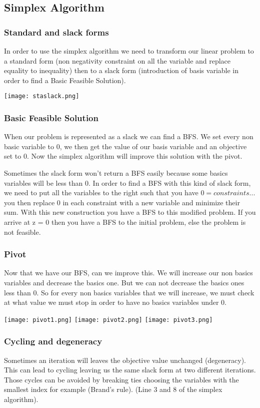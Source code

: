 \subsection{Simplex Algorithm}

\subsubsection{Standard and slack forms}
In order to use the simplex algorithm we need to transform our linear problem to a standard form (non negativity constraint on all the variable and replace equality to inequality) then to a slack form (introduction of basis variable in order to find a Basic Feasible Solution).

\centerline{\texttt{[image: staslack.png]}}

\subsubsection{Basic Feasible Solution}
When our problem is represented as a slack we can find a BFS. We set every non basic variable to 0, we then get the value of our basis variable and an objective set to 0. Now the simplex algorithm will improve this solution with the pivot.

Sometimes the slack form won't return a BFS easily because some basics variables will be less than 0. In order to find a BFS with this kind of slack form, we need to put all the variables to the right such that you have $0 = constraints ...$ you then replace 0 in each constraint with a new variable and minimize their sum. With this new construction you have a BFS to this modified problem. If you arrive at z = 0 then you have a BFS to the initial problem, else the problem is not feasible.

\subsubsection{Pivot}
Now that we have our BFS, can we improve this. We will increase our non basics variables and decrease the basics one. But we can not decrease the basics ones less than 0. So for every non basics variables that we will increase, we must check at what value we must stop in order to have no basics variables under 0.

\texttt{[image: pivot1.png]}
\texttt{[image: pivot2.png]}
\texttt{[image: pivot3.png]}

\subsubsection{Cycling and degeneracy}
Sometimes an iteration will leaves the objective value unchanged (degeneracy). This can lead to cycling leaving us the same slack form at two different iterations. Those cycles can be avoided by breaking ties choosing the variables with the smallest index for example (Brand's rule). (Line 3 and 8 of the simplex algorithm).

